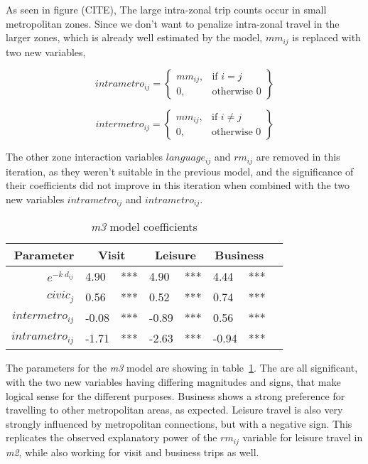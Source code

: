 As seen in figure (CITE), The large intra-zonal trip counts occur in small metropolitan zones. Since we don't want to penalize intra-zonal travel in the larger zones, which is already well estimated by the model,  $mm_{ij}$  is replaced with two new variables,

	$$	
	intrametro_{ij} = \left.
  \begin{cases}
    mm_{ij}, & \text{if } i = j \\
    0, & \text{otherwise } 0 
  \end{cases}
  \right\}
	$$
  
	$$	
	intermetro_{ij} = \left.
  \begin{cases}
    mm_{ij}, & \text{if } i \neq j \\
    0, & \text{otherwise } 0 
  \end{cases}
  \right\}
	$$
	
The other zone interaction variables $language_{ij}$  and $rm_{ij}$  are removed in this iteration, as they weren't suitable in the previous model, and the significance of their coefficients did not improve in this iteration when combined with the two new variables $intrametro_{ij}$ and $intrametro_{ij}$. 

\begin{table}[H]
\centering
\caption{\textit{m3} model coefficients}
\label{table:m3-coeff}
\begin{tabular}{@{}rlrlrlrl@{}}
  \toprule
 Parameter & \multicolumn{2}{c}{Visit} & \multicolumn{2}{c}{Leisure} & \multicolumn{2}{c}{Business} &  \\ \midrule
  $e^{-k\ d_{ij}}$ 	& 4.90 	& *** & 4.90 & *** & 4.44 & *** \\ 
  $civic_j$ & 0.56 	& *** 	& 0.52 & *** & 0.74 & *** \\ 
  $intermetro_{ij}$ & -0.08 & *** & -0.89 & *** & 0.56 & *** \\ 
  $intrametro_{ij}$ & -1.71 & *** & -2.63 & *** & -0.94 & *** \\ 
   \bottomrule
\end{tabular}
\end{table}

The parameters for the \textit{m3} model are showing in table~\ref{table:m3-coeff}. The are all significant, with the two new variables having differing magnitudes and signs, that make logical sense for the different purposes. Business shows a strong preference for travelling to other metropolitan areas, as expected. Leisure travel is also very strongly influenced by metropolitan connections, but with a negative sign. This replicates the observed explanatory power of the $rm_{ij}$ variable for leisure travel in \textit{m2}, while also working for visit and business trips as well.

